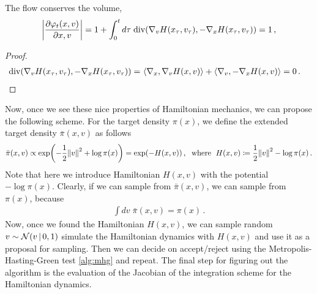 \begin{proposition}
    The flow conserves the volume, 
    \begin{align}
        \bigg|\frac{\partial \varphi_t(x,v)}{\partial x,v}\bigg| = 1+\int_0^t d\tau\;\mathrm{div}(\nabla_v H(x_\tau,v_\tau), -\nabla_x H(x_\tau,v_\tau)) = 1\,, 
    \end{align}
\end{proposition}
\begin{proof}
    \begin{align}
        \mathrm{div}(\nabla_v H(x_\tau,v_\tau), -\nabla_x H(x_\tau,v_\tau)) =~& \inner{\nabla_x}{\nabla_v H(x,v)} + \inner{\nabla_v}{-\nabla_x H(x,v)} = 0\,.
    \end{align}
\end{proof}

Now, once we see these nice properties of Hamiltonian mechanics, we can propose the following scheme. For the target density $\pi(x)$, we define the extended target density $\bar{\pi}(x,v)$ as follows
\begin{align}
    \bar{\pi}(x,v) \propto \exp\left(-\frac{1}{2}\norm{v}^2 + \log \pi(x) \right) = \exp\left(-H(x,v) \right)\,, \;\text{ where }\;H(x,v)\coloneqq \frac{1}{2}\norm{v}^2 - \log \pi(x)\,.
\end{align}
Note that here we introduce Hamiltonian $H(x,v)$ with the potential $-\log \pi(x)$. Clearly, if we can sample from $\bar{\pi}(x,v)$, we can sample from $\pi(x)$, because
\begin{align}
    \int dv\; \bar{\pi}(x,v) = \pi(x)\,.
\end{align}
Now, once we found the Hamiltonian $H(x,v)$, we can sample random $v \sim \mathcal{N}(v\,|\, 0,1)$ simulate the Hamiltonian dynamics with $H(x,v)$ and use it as a proposal for sampling. Then we can decide on accept/reject using the Metropolis-Hasting-Green test \cref{alg:mhg} and repeat. The final step for figuring out the algorithm is the evaluation of the Jacobian of the integration scheme for the Hamiltonian dynamics.

